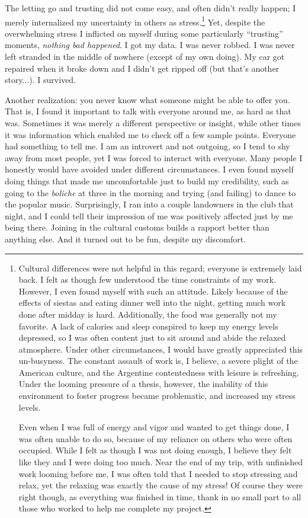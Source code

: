The letting go and trusting did not come easy, and often didn’t really happen; I merely internalized my uncertainty in others as stress.\footnote{Cultural differences were not helpful in this regard; everyone is extremely laid back. I felt as though few understood the time constraints of my work. However, I even found myself with such an attitude. Likely because of the effects of siestas and eating dinner well into the night, getting much work done after midday is hard. Additionally, the food was generally not my favorite. A lack of calories and sleep conspired to keep my energy levels depressed, so I was often content just to sit around and abide the relaxed atmosphere. Under other circumstances, I would have greatly appreciated this un-busyness. The constant assault of work is, I believe, a severe plight of the American culture, and the Argentine contentedness with leisure is refreshing. Under the looming pressure of a thesis, however, the inability of this environment to foster progress became problematic, and increased my stress levels.

Even when I was full of energy and vigor and wanted to get things done, I was often unable to do so, because of my reliance on others who were often occupied. While I felt as though I was not doing enough, I believe they felt like they and I were doing too much. Near the end of my trip, with unfinished work looming before me, I was often told that I needed to stop stressing and relax, yet the relaxing was exactly the cause of my stress! Of course they were right though, as everything was finished in time, thank in no small part to all those who worked to help me complete my project.} Yet, despite the overwhelming stress I inflicted on myself during some particularly ``trusting'' moments, \textit{nothing bad happened}. I got my data. I was never robbed. I was never left stranded in the middle of nowhere (except of my own doing). My car got repaired when it broke down and I didn't get ripped off (but that's another story...). I survived.

Another realization: you never know what someone might be able to offer you. That is, I found it important to talk with everyone around me, as hard as that was. Sometimes it was merely a different perspective or insight, while other times it was information which enabled me to check off a few sample points. Everyone had something to tell me. I am an introvert and not outgoing, so I tend to shy away from most people, yet I was forced to interact with everyone. Many people I honestly would have avoided under different circumstances. I even found myself doing things that made me uncomfortable just to build my credibility, such as going to the \textit{boliche} at three in the morning and trying (and failing) to dance to the popular music. Surprisingly, I ran into a couple landowners in the club that night, and I could tell their impression of me was positively affected just by me being there. Joining in the cultural customs builds a rapport better than anything else. And it turned out to be fun, despite my discomfort.

